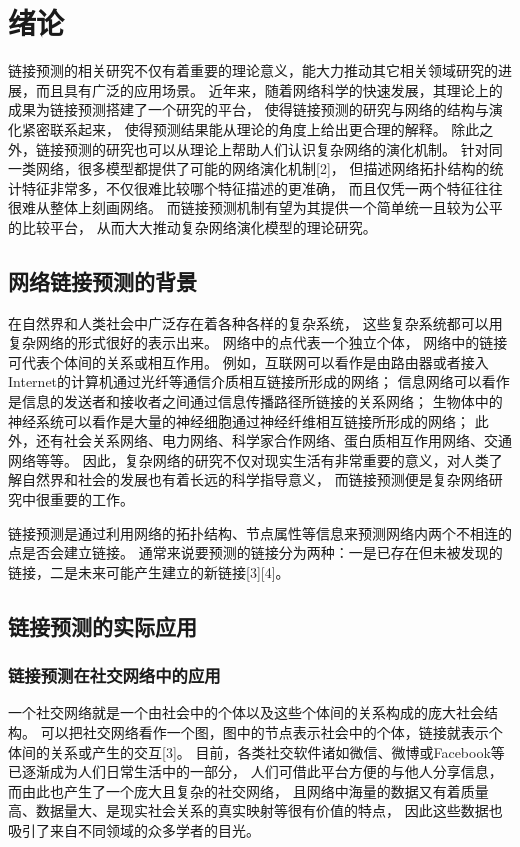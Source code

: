 
\chapter{绪论}
\label{chpt:introduction}

链接预测的相关研究不仅有着重要的理论意义，能大力推动其它相关领域研究的进展，而且具有广泛的应用场景。
近年来，随着网络科学的快速发展，其理论上的成果为链接预测搭建了一个研究的平台，
使得链接预测的研究与网络的结构与演化紧密联系起来，
使得预测结果能从理论的角度上给出更合理的解释。
除此之外，链接预测的研究也可以从理论上帮助人们认识复杂网络的演化机制。
针对同一类网络，很多模型都提供了可能的网络演化机制[2]，
但描述网络拓扑结构的统计特征非常多，不仅很难比较哪个特征描述的更准确，
而且仅凭一两个特征往往很难从整体上刻画网络。
而链接预测机制有望为其提供一个简单统一且较为公平的比较平台，
从而大大推动复杂网络演化模型的理论研究。



\section{网络链接预测的背景}

在自然界和人类社会中广泛存在着各种各样的复杂系统，
这些复杂系统都可以用复杂网络的形式很好的表示出来。
网络中的点代表一个独立个体，
网络中的链接可代表个体间的关系或相互作用。
例如，互联网可以看作是由路由器或者接入Internet的计算机通过光纤等通信介质相互链接所形成的网络；
信息网络可以看作是信息的发送者和接收者之间通过信息传播路径所链接的关系网络；
生物体中的神经系统可以看作是大量的神经细胞通过神经纤维相互链接所形成的网络；
此外，还有社会关系网络、电力网络、科学家合作网络、蛋白质相互作用网络、交通网络等等。
因此，复杂网络的研究不仅对现实生活有非常重要的意义，对人类了解自然界和社会的发展也有着长远的科学指导意义，
而链接预测便是复杂网络研究中很重要的工作。


链接预测是通过利用网络的拓扑结构、节点属性等信息来预测网络内两个不相连的点是否会建立链接。
通常来说要预测的链接分为两种：一是已存在但未被发现的链接，二是未来可能产生建立的新链接[3][4]。


\section{链接预测的实际应用}
\subsection{链接预测在社交网络中的应用}
\label{intro:sec:social}
一个社交网络就是一个由社会中的个体以及这些个体间的关系构成的庞大社会结构。
可以把社交网络看作一个图，图中的节点表示社会中的个体，链接就表示个体间的关系或产生的交互[3]。
目前，各类社交软件诸如微信、微博或Facebook等已逐渐成为人们日常生活中的一部分，
人们可借此平台方便的与他人分享信息，而由此也产生了一个庞大且复杂的社交网络，
且网络中海量的数据又有着质量高、数据量大、是现实社会关系的真实映射等很有价值的特点，
因此这些数据也吸引了来自不同领域的众多学者的目光。

